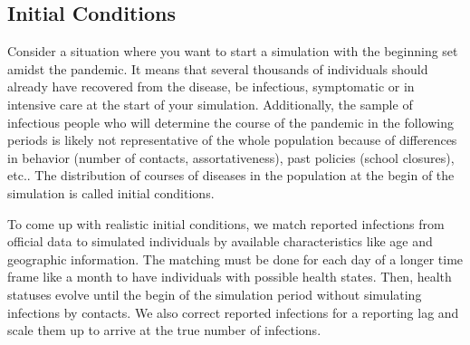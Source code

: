 \subsection{Initial Conditions} %
\label{sub:initial_conditions}

Consider a situation where you want to start a simulation with the beginning set amidst
the pandemic. It means that several thousands of individuals should already have
recovered from the disease, be infectious, symptomatic or in intensive care at the start
of your simulation.
Additionally, the sample of infectious people who will determine the course of the
pandemic in the following periods is likely not representative of the whole population
because of differences in behavior (number of contacts, assortativeness), past policies
(school closures), etc..
The distribution of courses of diseases in the population at the begin of the simulation is
called initial conditions.

To come up with realistic initial conditions, we match reported infections from official
data to simulated individuals by available characteristics like age and geographic
information. The matching must be done for each day of a longer time frame like a month
to have individuals with possible health states. Then, health statuses evolve until the
begin of the simulation period without simulating infections by contacts.
We also correct reported infections for a reporting lag and scale them up to arrive
at the true number of infections.

